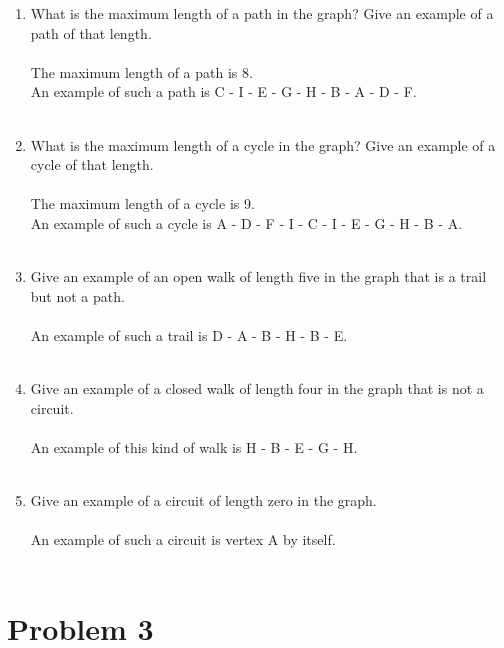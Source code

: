 \documentclass{amsart}
\theoremstyle{definition}
\theoremstyle{Exercise}
\theoremstyle{remark}
\theoremstyle{rule}
\numberwithin{equation}{section}
\begin{document}
    \begin{enumerate}[label=(\roman*)]
        \item What is the maximum length of a path in the graph? Give an example of a path of that length.\\\\
           The maximum length of a path is 8. \\
            An example of such a path is C - I - E - G - H - B - A - D - F.
\\\\
        \item What is the maximum length of a cycle in the graph? Give an example of a cycle of that length.\\\\
           The maximum length of a cycle is 9.\\
            An example of such a cycle is A - D - F - I - C - I - E - G - H - B - A.
\\\\
        \item Give an example of an open walk of length five in the graph that is a trail but not a path.\\\\
           An example of such a trail is D - A - B - H - B - E.
\\\\
        \item Give an example of a closed walk of length four in the graph that is not a circuit.\\\\
           An example of this kind of walk is H - B - E - G - H.
\\\\
        \item Give an example of a circuit of length zero in the graph.\\\\
           An example of such a circuit is vertex A by itself.
\\\\
    \end{enumerate}
    \newpage
    


\section*{Problem 3}
\end{document}
